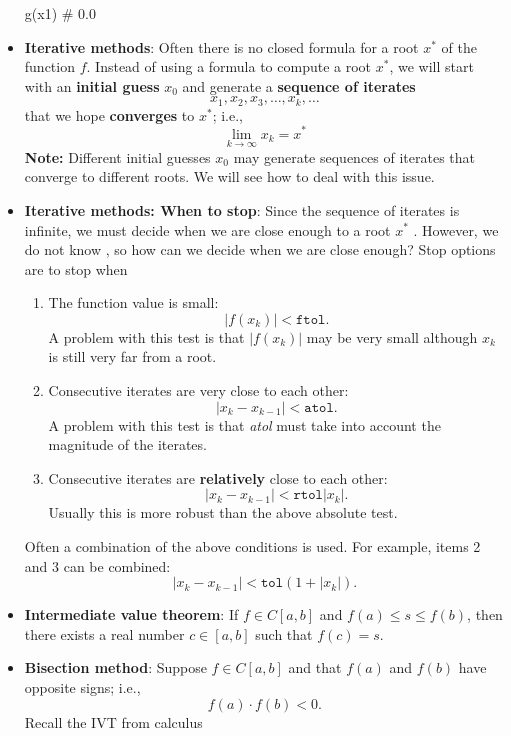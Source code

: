 \documentclass{report}
\begin{document}
\begin{itemize}
\begin{jlcode}
        g(x1) # 0.0
    \end{jlcode}
\item \textbf{Iterative methods}: Often there is no closed formula for a root $x^*$ of the function $f$. Instead of using a formula to compute a root $x^*$, we will start with an \textbf{initial guess} $x_0$ and generate a \textbf{sequence of iterates}
    \bigbreak \noindent 
    $$ x_1, x_2, x_3, \ldots, x_k, \ldots $$
    that we hope \textbf{converges} to $x^*$; i.e.,
    $$\lim_{k \to \infty} x_k = x^*$$
    \textbf{Note:} Different initial guesses $x_0$ may generate sequences of iterates that converge to different roots. We will see how to deal with this issue.
\item \textbf{Iterative methods: When to stop}: Since the sequence of iterates is infinite, we must decide when we are close enough to a root $x^{*}$ . However, we do not know , so how can we decide when we are close enough?
    \bigbreak \noindent 
    Stop options are to stop when
    \begin{enumerate}
        \item The function value is small:
            $$\left|f(x_k)\right| < \mathtt{ftol}.$$
             A problem with this test is that $\left|f(x_k)\right|$ may be very small although $x_k$ is still very far from a root.
         \item Consecutive iterates are very close to each other:
             $$\left|x_k - x_{k-1}\right| < \mathtt{atol}.$$
             A problem with this test is that \textit{atol} must take into account the magnitude of the iterates.
         \item  Consecutive iterates are \textbf{relatively} close to each other:
              $$\left|x_k - x_{k-1}\right| < \mathtt{rtol} \left|x_k\right|.$$
               Usually this is more robust than the above absolute test.
    \end{enumerate}
    Often a combination of the above conditions is used. For example, items 2 and 3 can be combined:
    $$\left|x_k - x_{k-1}\right| < \mathtt{tol}(1 + \left|x_k\right|).$$
\item \textbf{Intermediate value theorem}:     If $f \in C[a,b]$ and $f(a) \leq s \leq f(b)$, then there exists a real number $c \in [a,b]$ such that $f(c) = s$.
\item \textbf{Bisection method}: Suppose $f \in C[a,b]$ and that $f(a)$ and $f(b)$ have opposite signs; i.e.,
    $$
    f(a) \cdot f(b) < 0.
    $$
    \bigbreak \noindent 
    Recall the IVT from calculus
    \bigbreak \noindent 

\end{itemize}
\end{document}
